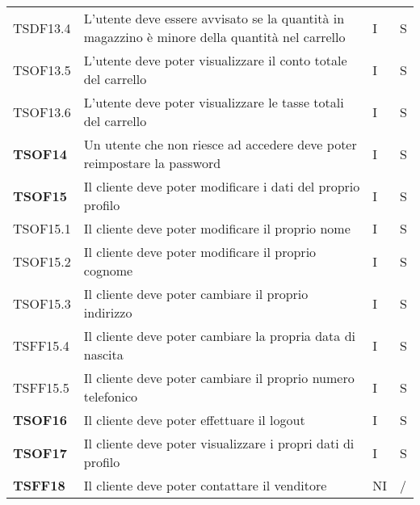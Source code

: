 \begin{center}
\begin{longtable}[!h]{p{60px} p{240px} p{35px} p{35px}}
        TSDF13.4        & L'utente deve essere avvisato se la quantità in magazzino è minore della quantità nel carrello      & I              & S              \\
        TSOF13.5        & L'utente deve poter visualizzare il conto totale del carrello                                       & I              & S              \\
        TSOF13.6        & L'utente deve poter visualizzare le tasse totali del carrello                                       & I              & S              \\
        \textbf{TSOF14} & Un utente che non riesce ad accedere deve poter reimpostare la password                             & I              & S              \\
        \textbf{TSOF15} & Il cliente deve poter modificare i dati del proprio profilo                                         & I              & S              \\
        TSOF15.1        & Il cliente deve poter modificare il proprio nome                                                    & I              & S              \\
        TSOF15.2        & Il cliente deve poter modificare il proprio cognome                                                 & I              & S              \\
        TSOF15.3        & Il cliente deve poter cambiare il proprio indirizzo                                                 & I              & S              \\
        TSFF15.4        & Il cliente deve poter cambiare la propria data di nascita                                           & I              & S              \\
        TSFF15.5        & Il cliente deve poter cambiare il proprio numero telefonico                                         & I              & S              \\
        \textbf{TSOF16} & Il cliente deve poter effettuare il logout                                                          & I              & S              \\
        \textbf{TSOF17} & Il cliente deve poter visualizzare i propri dati di profilo                                         & I              & S              \\
        \textbf{TSFF18} & Il cliente deve poter contattare il venditore                                                       & NI             & /              \\

\end{longtable}
\end{center}
